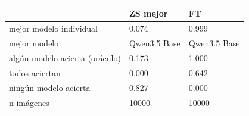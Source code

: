 \begin{tabular}{lll}
\toprule
 & ZS mejor & FT \\
\midrule
mejor modelo individual & 0.074 & 0.999 \\
mejor modelo & Qwen3.5 Base & Qwen3.5 Base \\
algún modelo acierta (oráculo) & 0.173 & 1.000 \\
todos aciertan & 0.000 & 0.642 \\
ningún modelo acierta & 0.827 & 0.000 \\
n imágenes & 10000 & 10000 \\
\bottomrule
\end{tabular}
